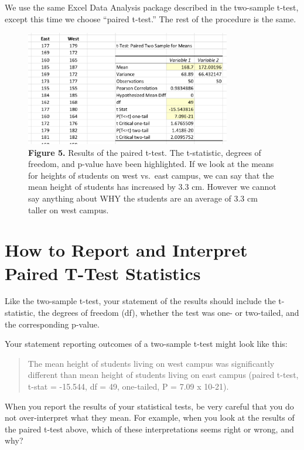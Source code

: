 \documentclass[
]{book}
\begin{document}
We use the same Excel Data Analysis package described in the two-sample t-test, except this time we choose ``paired t-test.'' The rest of the procedure is the same.

\begin{figure}
\centering
\includegraphics[width=0.8\textwidth,height=\textheight]{images/Paired_T.png}
\caption{\textbf{Figure 5.} Results of the paired t-test. The t-statistic, degrees of freedom, and p-value have been highlighted. If we look at the means for heights of students on west vs.~east campus, we can say that the mean height of students has increased by 3.3 cm. However we cannot say anything about WHY the students are an average of 3.3 cm taller on west campus.}
\end{figure}

\hypertarget{how-to-report-and-interpret-paired-t-test-statistics}{%
\section{How to Report and Interpret Paired T-Test Statistics}\label{how-to-report-and-interpret-paired-t-test-statistics}}

Like the two-sample t-test, your statement of the results should include the t-statistic, the degrees of freedom (df), whether the test was one- or two-tailed, and the corresponding p-value.

Your statement reporting outcomes of a two-sample t-test might look like this:

\begin{quote}
The mean height of students living on west campus was significantly different than mean height of students living on east campus (paired t-test, t-stat = -15.544, df = 49, one-tailed, P = 7.09 x 10-21).
\end{quote}

When you report the results of your statistical tests, be very careful that you do not over-interpret what they mean. For example, when you look at the results of the paired t-test above, which of these interpretations seems right or wrong, and why?
\end{document}
